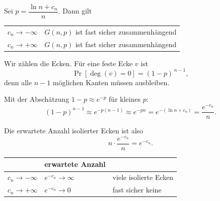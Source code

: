 \begin{merksatz}
Sei $p = \dfrac{\ln n + c_n}{n}$. Dann gilt
\begin{center}
\renewcommand{\arraystretch}{1.5}
\begin{tabular}{@{}P{2.6cm}P{6.0cm}@{}}
\toprule
$c_n \to -\infty$ & $G(n,p)$ ist fast sicher zusammenhängend\\
$c_n \to +\infty$ & $G(n,p)$ ist fast sicher zusammenhängend\\
\bottomrule
\end{tabular}
\end{center}

Wir zählen die  Ecken. Für eine feste Ecke $v$ ist
\[ \Pr[\deg(v) = 0] = (1-p)^{\,n-1} , \]
denn alle $n-1$ möglichen Kanten müssen ausbleiben.

Mit der Abschätzung $1 - p \approx e^{-p}$ für kleines $p$:
\[ (1-p)^{n-1} \approx e^{-p(n-1)} \approx e^{-pn} = e^{-(\ln n + c_n)} = \frac{e^{-c_n}}{n} . \]

Die erwartete Anzahl isolierter Ecken ist also
\[ n \cdot \frac{e^{-c_n}}{n} = e^{-c_n} . \]

\begin{center}
\renewcommand{\arraystretch}{1.45}
\begin{tabular}{@{}P{2.4cm}P{2.6cm}P{3.2cm}@{}}
\toprule
& \textbf{erwartete Anzahl} & \\
\midrule
$c_n \to -\infty$ & $e^{-c_n} \to \infty$ & \textcolor{akzent}{viele isolierte Ecken}\\
$c_n \to +\infty$ & $e^{-c_n} \to 0$ & \textcolor{gruen}{fast sicher keine}\\
\bottomrule
\end{tabular}
\end{center}

\begin{center}
\begin{minipage}{0.88\textwidth}
\end{minipage}
\end{center}
\end{merksatz}


